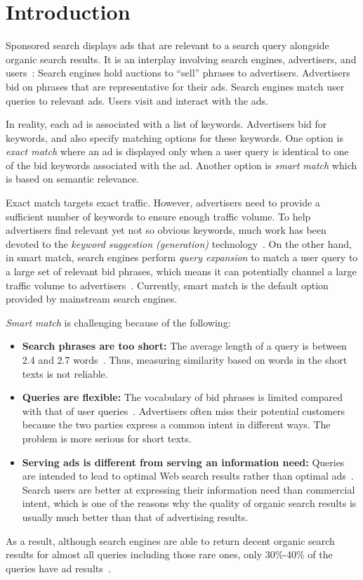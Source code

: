 \section{Introduction}
Sponsored search displays ads that are relevant to a search query
alongside organic search results.  It is an interplay involving search
engines, advertisers, and users~\cite{broder:relevancefeedback}:
Search engines hold auctions to ``sell'' phrases to advertisers.
Advertisers bid on phrases that are representative for their ads.
Search engines match user queries to relevant ads.  Users visit and
interact with the ads.

In reality, each ad is associated with a list of keywords.
Advertisers bid for keywords, and also specify matching options for
these keywords.  One option is \emph{exact match} where an ad is
displayed only when a user query is identical to one of the bid
keywords associated with the ad.  Another option is \emph{smart match}
which is based on semantic relevance.

Exact match targets exact traffic. However, advertisers need to
provide a sufficient number of keywords to ensure enough traffic
volume.  To help advertisers find relevant yet not so obvious
keywords, much work has been devoted to the \emph{keyword suggestion
  (generation)} technology~\cite{chen:concepthierarchy}.  On the other
hand, in smart match, search engines perform \emph{query expansion} to
match a user query to a large set of relevant bid phrases, which means
it can potentially channel a large traffic volume to
advertisers~\cite{wang:advertisementsearch}. Currently, smart match is
the default option provided by mainstream search engines.



\emph{Smart match} is challenging because of the following:
\begin{itemize}
\item \textbf{Search phrases are too short:} The average length of a
  query is between 2.4 and 2.7 words~\cite{broder:webknowledge}.
  Thus, measuring similarity based on words in the short texts is not
  reliable.
\item \textbf{Queries are flexible:} The vocabulary of bid phrases is
  limited compared with that of user
  queries~\cite{wang:advertisementsearch}.  Advertisers often miss
  their potential customers because the two parties express a common
  intent in different ways.  The problem is more serious for short
  texts.
\item \textbf{Serving ads is different from serving an information
    need:} Queries are intended to lead to optimal Web search results
  rather than optimal ads~\cite{broder:relevancefeedback}.  Search
  users are better at expressing their information need than
  commercial intent, which is one of the reasons why the quality of
  organic search results is usually much better than that of
  advertising results.
\end{itemize}
As a result, although search engines are able to return decent organic
search results for almost all queries including those rare ones, only
30\%-40\% of the queries have ad
results~\cite{broder:sponsoredsearch}.

